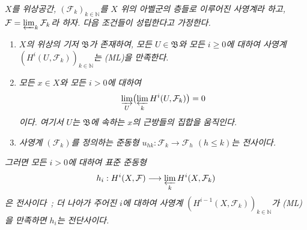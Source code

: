 \begin{proposition}[13.3.1]
\label{0.13.3.1-fr}
\emph{$X$를 위상공간,
$(\mathcal F_k)_{k\in\mathbb N}$를 $X$ 위의 아벨군의 층들로 이루어진
사영계라 하고,
$\mathcal F=\varprojlim_k\mathcal F_k$라 하자. 다음 조건들이 성립한다고
가정한다.}
\begin{enumerate}
\item[\emph{(i)}]
\emph{$X$의 위상의 기저 $\mathfrak B$가 존재하여, 모든
$U\in\mathfrak B$와 모든 $i\geq0$에 대하여 사영계
$(H^i(U,\mathcal F_k))_{k\in\mathbb N}$는 (ML)을 만족한다.}
\item[\emph{(ii)}]
\emph{모든 $x\in X$와 모든 $i>0$에 대하여}
\[
\varinjlim_U\bigl(\varprojlim_k H^i(U,\mathcal F_k)\bigr)=0
\]
\emph{이다. 여기서 $U$는 $\mathfrak B$에 속하는 $x$의 근방들의 집합을
움직인다.}
\item[\emph{(iii)}]
\emph{사영계 $(\mathcal F_k)$를 정의하는 준동형
$u_{hk}:\mathcal F_k\to\mathcal F_h$ $(h\leq k)$는 전사이다.}
\end{enumerate}
\emph{그러면 모든 $i>0$에 대하여 표준 준동형}
\[
h_i:H^i(X,\mathcal F)\longrightarrow
\varprojlim_k H^i(X,\mathcal F_k)
\]
\emph{은 전사이다~; 더 나아가 주어진 $i$에 대하여 사영계
$(H^{i-1}(X,\mathcal F_k))_{k\in\mathbb N}$가 (ML)을 만족하면 $h_i$는
전단사이다.}
\end{proposition}

